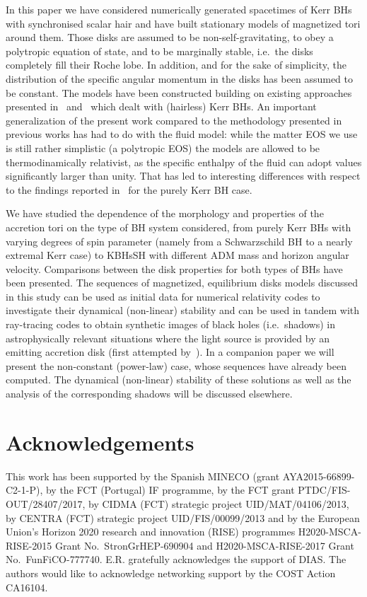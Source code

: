 \documentclass[twocolumn,aps,showpacs,showkeys,prd,superscriptaddress,byrevtex, amsmath]{revtex4-1}
\begin{document}
In this paper we have considered numerically generated spacetimes of Kerr BHs with synchronised scalar hair and have built stationary models of magnetized tori around them. Those disks are assumed to be non-self-gravitating, to obey a polytropic equation of state, and to be marginally stable, i.e.~the disks completely fill their Roche lobe. In addition, and for the sake of simplicity, the distribution of the specific angular momentum in the disks has been assumed to be constant. The models have been constructed building on existing approaches presented in~\cite{Komissarov:2006} and~\cite{Gimeno-Soler:2017} which dealt with (hairless) Kerr BHs. An important generalization of the present work compared to the methodology presented in previous works has had to do with the fluid model: while the matter EOS we use is still rather simplistic (a polytropic EOS) the models are allowed to be thermodinamically relativist, as the specific enthalpy of the fluid can adopt values significantly larger than unity. That has led to interesting differences with respect to the findings reported in~\cite{Gimeno-Soler:2017} for the purely Kerr BH case.

We have studied the dependence of the morphology and properties of the accretion tori on the type of BH system considered, from purely Kerr BHs with varying degrees of spin parameter (namely from a Schwarzschild BH to a nearly extremal Kerr case)  to KBHsSH with different ADM mass and horizon angular velocity. Comparisons between the disk properties for both types of BHs have been presented. The sequences of magnetized, equilibrium disks models discussed in this study can be used as initial data for numerical relativity codes to investigate their dynamical (non-linear) stability and can be used in tandem with ray-tracing codes to obtain synthetic images of black holes (i.e.~shadows) in astrophysically relevant situations where the light source is provided by an emitting accretion disk (first attempted by~\cite{Vincent:2016}). In a companion paper we will present the non-constant (power-law) case, whose sequences have already been computed. The dynamical (non-linear) stability of these solutions as well as the analysis of the corresponding shadows will be discussed elsewhere.

\section*{Acknowledgements}

This work has been supported by the Spanish MINECO (grant AYA2015-66899-C2-1-P), by the FCT (Portugal) IF programme, by the FCT grant PTDC/FIS-OUT/28407/2017, by  CIDMA (FCT) strategic project UID/MAT/04106/2013, by CENTRA (FCT) strategic project UID/FIS/00099/2013 and by  the  European  Union's  Horizon  2020  research  and  innovation  (RISE) programmes H2020-MSCA-RISE-2015 Grant No.~StronGrHEP-690904 and H2020-MSCA-RISE-2017 Grant No.~FunFiCO-777740. E.R. gratefully acknowledges the support of DIAS. The authors would like to acknowledge networking support by the COST Action CA16104.  
\end{document}
